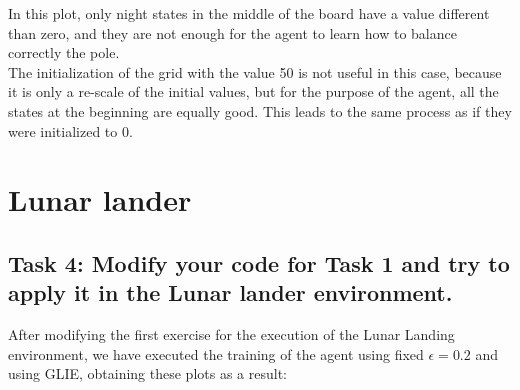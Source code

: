 \documentclass[12pt]{article}
\begin{document}
In this plot, only night states in the middle of the board have a value different than zero, and they are not enough for the agent to learn how to balance correctly the pole. \\

The initialization of the grid with the value 50 is not useful in this case, because it is only a re-scale of the initial values, but for the purpose of the agent, all the states at the beginning are equally good. This leads to the same process as if they were initialized to 0.

\section{Lunar lander}

\subsection{Task 4: Modify your code for Task 1 and try to apply it in the Lunar lander environment.}

After modifying the first exercise for the execution of the Lunar Landing environment, we have executed the training of the agent using fixed $\epsilon=0.2$ and using GLIE, obtaining these plots as a result:
\end{document}
